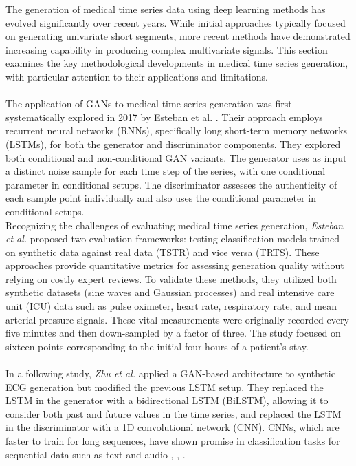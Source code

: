 The generation of medical time series data using deep learning methods has evolved significantly over recent years. While initial approaches typically focused on generating univariate short segments, more recent methods have demonstrated increasing capability in producing complex multivariate signals. This section examines the key methodological developments in medical time series generation, with particular attention to their applications and limitations.
\\ \\
The application of GANs to medical time series generation was first systematically explored in 2017 by Esteban et al. \cite{esteban_real-valued_2017}. Their approach employs recurrent neural networks (RNNs), specifically long short-term memory networks (LSTMs), for both the generator and discriminator components.
They explored both conditional and non-conditional GAN variants. The generator uses as input a distinct noise sample for each time step of the series, with one conditional parameter in conditional setups. The discriminator assesses the authenticity of each sample point individually and also uses the conditional parameter in conditional setups.
\\
Recognizing the challenges of evaluating medical time series generation, \textit{Esteban et al.} proposed two evaluation frameworks: testing classification models trained on synthetic data against real data (TSTR) and vice versa (TRTS). These approaches provide quantitative metrics for assessing generation quality without relying on costly expert reviews.
To validate these methods, they utilized both synthetic datasets (sine waves and Gaussian processes) and real intensive care unit (ICU) data such as pulse oximeter, heart rate, respiratory rate, and mean arterial pressure signals. These vital measurements were originally recorded every five minutes and then down-sampled by a factor of three. The study focused on sixteen points corresponding to the initial four hours of a patient's stay. 
\\ \\
In a following study, \textit{Zhu et al.} \cite{zhu_electrocardiogram_2019} applied a GAN-based architecture to synthetic ECG generation but modified the previous LSTM setup. They replaced the LSTM in the generator with a bidirectional LSTM (BiLSTM), allowing it to consider both past and future values in the time series, and replaced the LSTM in the discriminator with a 1D convolutional network (CNN). CNNs, which are faster to train for long sequences, have shown promise in classification tasks for sequential data such as text and audio \cite{lecun_convolutional_1995}, \cite{kim_convolutional_2014}, \cite{zhang_character-level_2016}. 
